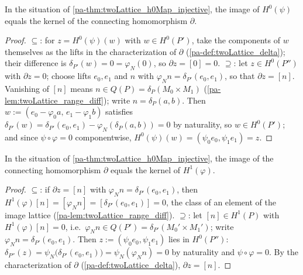 \begin{theorem}
  \label{pa-thm:twoLattice_exact_h0_delta}
  \leanok

  In the situation of \ref{pa-thm:twoLattice_h0Map_injective}, the image of
  \(H^0(\psi)\) equals the kernel of the connecting homomorphism \(\partial\).
\end{theorem}
\begin{proof}
  \leanok
  \(\subseteq\): for \(z = H^0(\psi)(w)\) with \(w \in H^0(P')\), take the components
  of \(w\) themselves as the lifts in the characterization of \(\partial\)
  (\ref{pa-def:twoLattice_delta}); their difference is \(\delta_{P'}(w) = 0 =
  \varphi_N(0)\), so \(\partial z = [0] = 0\).
  \(\supseteq\): let \(z \in H^0(P'')\) with \(\partial z = 0\); choose lifts
  \(e_0, e_1\) and \(n\) with \(\varphi_N n = \delta_{P'}(e_0, e_1)\), so that
  \(\partial z = [n]\). Vanishing of \([n]\) means \(n \in Q(P) =
  \delta_P(M_0 \times M_1)\) (\ref{pa-lem:twoLattice_range_diff}); write
  \(n = \delta_P(a, b)\). Then \(w := (e_0 - \varphi_0 a,\, e_1 - \varphi_1 b)\)
  satisfies
  \(\delta_{P'}(w) = \delta_{P'}(e_0,e_1) - \varphi_N(\delta_P(a,b)) = 0\)
  by naturality, so \(w \in H^0(P')\); and since \(\psi\circ\varphi = 0\)
  componentwise, \(H^0(\psi)(w) = (\psi_0 e_0, \psi_1 e_1) = z\).
\end{proof}

\begin{theorem}
  \label{pa-thm:twoLattice_exact_delta_h1}
  \leanok

  In the situation of \ref{pa-thm:twoLattice_h0Map_injective}, the image of the
  connecting homomorphism \(\partial\) equals the kernel of \(H^1(\varphi)\).
\end{theorem}
\begin{proof}
  \leanok
  \(\subseteq\): if \(\partial z = [n]\) with \(\varphi_N n = \delta_{P'}(e_0, e_1)\),
  then \(H^1(\varphi)[n] = [\varphi_N n] = [\delta_{P'}(e_0,e_1)] = 0\), the class of
  an element of the image lattice (\ref{pa-lem:twoLattice_range_diff}).
  \(\supseteq\): let \([n] \in H^1(P)\) with \(H^1(\varphi)[n] = 0\), i.e.\
  \(\varphi_N n \in Q(P') = \delta_{P'}(M_0' \times M_1')\); write
  \(\varphi_N n = \delta_{P'}(e_0, e_1)\). Then
  \(z := (\psi_0 e_0, \psi_1 e_1)\) lies in \(H^0(P'')\):
  \(\delta_{P''}(z) = \psi_N\bigl(\delta_{P'}(e_0,e_1)\bigr) = \psi_N(\varphi_N n) = 0\)
  by naturality and \(\psi\circ\varphi = 0\). By the characterization of \(\partial\)
  (\ref{pa-def:twoLattice_delta}), \(\partial z = [n]\).
\end{proof}

